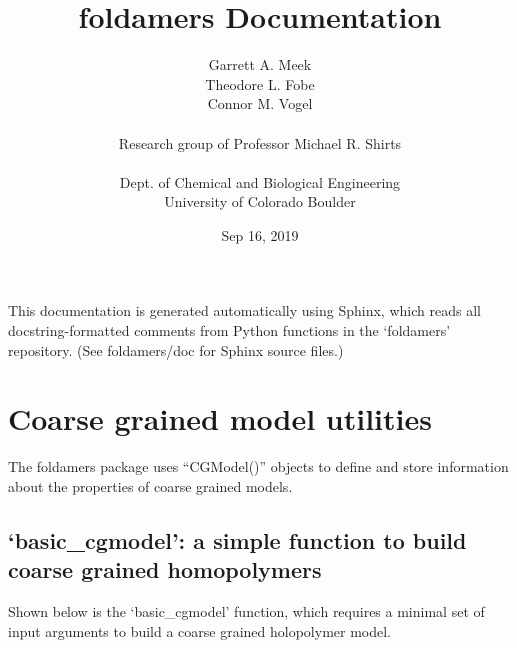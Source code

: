 \documentclass[letterpaper,12pt,english,openany,oneside]{sphinxmanual}
\title{foldamers Documentation}
\date{Sep 16, 2019}
\author{Garrett A. Meek\\Theodore L. Fobe\\Connor M. Vogel\\ \\Research group of Professor Michael R. Shirts\\ \\Dept. of Chemical and Biological Engineering\\University of Colorado Boulder}
\begin{document}
\pagestyle{empty}
\sphinxmaketitle
\pagestyle{plain}
\sphinxtableofcontents
\pagestyle{normal}
\label{\detokenize{index::doc}}


This documentation is generated automatically using Sphinx, which reads all docstring-formatted comments from Python functions in the ‘foldamers’ repository.  (See foldamers/doc for Sphinx source files.)


\chapter{Coarse grained model utilities}
\label{\detokenize{cg_model:coarse-grained-model-utilities}}\label{\detokenize{cg_model::doc}}
The foldamers package uses “CGModel()” objects to define and store information about the properties of coarse grained models.


\section{‘basic\_cgmodel’: a simple function to build coarse grained homopolymers}
\label{\detokenize{cg_model:basic-cgmodel-a-simple-function-to-build-coarse-grained-homopolymers}}
Shown below is the ‘basic\_cgmodel’ function, which requires a minimal set of input arguments to build a coarse grained holopolymer model.

\label{\detokenize{cg_model:module-cg_model.cgmodel}}
\end{document}
